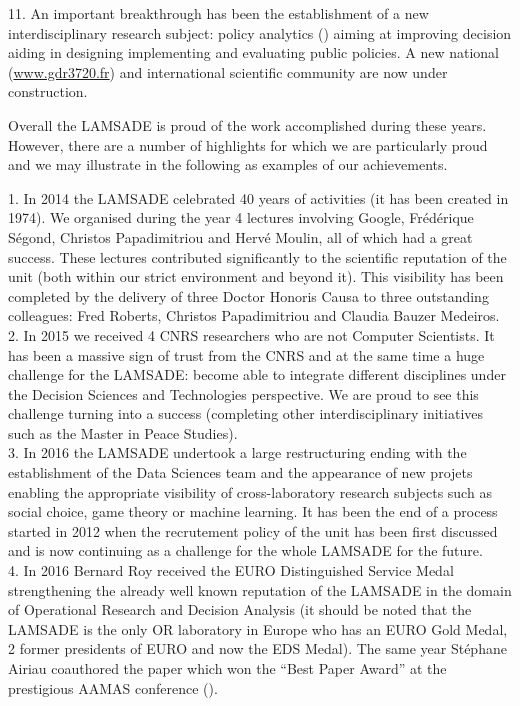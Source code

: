 11. An important breakthrough has been the establishment of a new interdisciplinary research subject: policy analytics (\cite{Belton2013Policy-624015}) aiming at improving decision aiding in designing implementing and evaluating public policies. A new national (\url{www.gdr3720.fr}) and international scientific community are now under construction.
\vspace{5mm}

Overall the LAMSADE is proud of the work accomplished during these years. However, there are a number of highlights for which we are particularly proud and we may illustrate in the following as examples of our achievements.

1. In 2014 the LAMSADE celebrated 40 years of activities (it has been created in 1974). We organised during the year 4 lectures involving Google, Frédérique Ségond, Christos Papadimitriou and Hervé Moulin, all of which had a great success. These lectures contributed significantly to the scientific reputation of the unit (both within our strict environment and beyond it). This visibility has been completed by the delivery of three Doctor Honoris Causa to three outstanding colleagues: Fred Roberts, Christos Papadimitriou and Claudia Bauzer Medeiros. \\
2. In 2015 we received 4 CNRS researchers who are not Computer Scientists. It has been a massive sign of trust from the CNRS and at the same time a huge challenge for the LAMSADE: become able to integrate different disciplines under the Decision Sciences and Technologies perspective. We are proud to see this challenge turning into a success (completing other interdisciplinary initiatives such as the Master in Peace Studies). \\
3. In 2016 the LAMSADE undertook a large restructuring ending with the establishment of the Data Sciences team and the appearance of new projets enabling the appropriate visibility of cross-laboratory research subjects such as social choice, game theory or machine learning. It has been the end of a process started in 2012 when the recrutement policy of the unit has been first discussed and is now continuing as a challenge for the whole LAMSADE for the future. \\
4. In 2016 Bernard Roy received the EURO Distinguished Service Medal strengthening the already well known reputation of the LAMSADE in the domain of Operational Research and Decision Analysis (it should be noted that the LAMSADE is the only OR laboratory in Europe who has an EURO Gold Medal, 2 former presidents of EURO and now the EDS Medal). The same year Stéphane Airiau coauthored the paper which won the ``Best Paper Award'' at the prestigious AAMAS conference (\cite{Airiau2016Rationalisation-1088325}). \\
